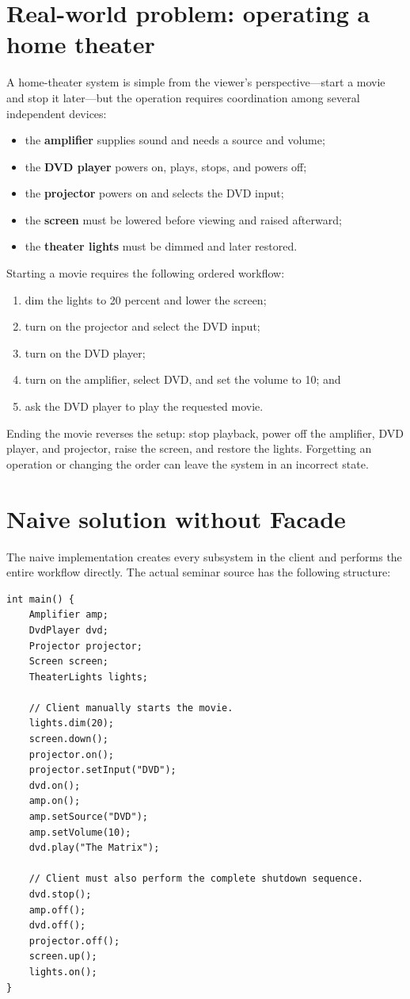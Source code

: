 \documentclass[11pt,a4paper]{report}
\begin{document}
\section{Real-world problem: operating a home theater}
A home-theater system is simple from the viewer's perspective---start a movie
and stop it later---but the operation requires coordination among several
independent devices:
\begin{itemize}
  \item the \textbf{amplifier} supplies sound and needs a source and volume;
  \item the \textbf{DVD player} powers on, plays, stops, and powers off;
  \item the \textbf{projector} powers on and selects the DVD input;
  \item the \textbf{screen} must be lowered before viewing and raised afterward;
  \item the \textbf{theater lights} must be dimmed and later restored.
\end{itemize}

Starting a movie requires the following ordered workflow:
\begin{enumerate}
  \item dim the lights to 20 percent and lower the screen;
  \item turn on the projector and select the DVD input;
  \item turn on the DVD player;
  \item turn on the amplifier, select DVD, and set the volume to 10; and
  \item ask the DVD player to play the requested movie.
\end{enumerate}
Ending the movie reverses the setup: stop playback, power off the amplifier,
DVD player, and projector, raise the screen, and restore the lights. Forgetting
an operation or changing the order can leave the system in an incorrect state.

\section{Naive solution without Facade}
The naive implementation creates every subsystem in the client and performs the
entire workflow directly. The actual seminar source has the following structure:

\begin{lstlisting}[style=cpp]
int main() {
    Amplifier amp;
    DvdPlayer dvd;
    Projector projector;
    Screen screen;
    TheaterLights lights;

    // Client manually starts the movie.
    lights.dim(20);
    screen.down();
    projector.on();
    projector.setInput("DVD");
    dvd.on();
    amp.on();
    amp.setSource("DVD");
    amp.setVolume(10);
    dvd.play("The Matrix");

    // Client must also perform the complete shutdown sequence.
    dvd.stop();
    amp.off();
    dvd.off();
    projector.off();
    screen.up();
    lights.on();
}
\end{lstlisting}
\end{document}
